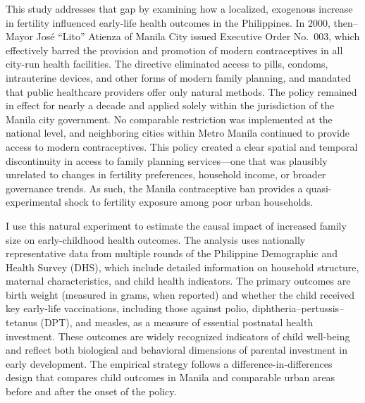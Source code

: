 \documentclass[]{AEA}
\begin{document}
This study addresses that gap by examining how a localized, exogenous
increase in fertility influenced early-life health outcomes in the
Philippines. In 2000, then--Mayor José ``Lito'' Atienza of Manila City
issued Executive Order No.~003, which effectively barred the provision
and promotion of modern contraceptives in all city-run health
facilities. The directive eliminated access to pills, condoms,
intrauterine devices, and other forms of modern family planning, and
mandated that public healthcare providers offer only natural methods.
The policy remained in effect for nearly a decade and applied solely
within the jurisdiction of the Manila city government. No comparable
restriction was implemented at the national level, and neighboring
cities within Metro Manila continued to provide access to modern
contraceptives. This policy created a clear spatial and temporal
discontinuity in access to family planning services---one that was
plausibly unrelated to changes in fertility preferences, household
income, or broader governance trends. As such, the Manila contraceptive
ban provides a quasi-experimental shock to fertility exposure among poor
urban households.

I use this natural experiment to estimate the causal impact of increased
family size on early-childhood health outcomes. The analysis uses
nationally representative data from multiple rounds of the Philippine
Demographic and Health Survey (DHS), which include detailed information
on household structure, maternal characteristics, and child health
indicators. The primary outcomes are birth weight (measured in grams,
when reported) and whether the child received key early-life
vaccinations, including those against polio,
diphtheria--pertussis--tetanus (DPT), and measles, as a measure of
essential postnatal health investment. These outcomes are widely
recognized indicators of child well-being and reflect both biological
and behavioral dimensions of parental investment in early development.
The empirical strategy follows a difference-in-differences design that
compares child outcomes in Manila and comparable urban areas before and
after the onset of the policy.
\end{document}
